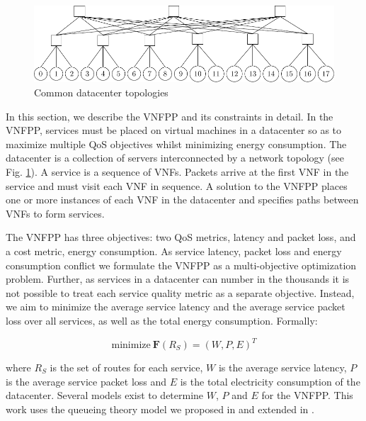 \begin{figure}[t]
\begin{minipage}{.53\textwidth}
        \includegraphics[width=\textwidth]{figures/topologies/leafspine}
    \end{minipage}\hfill
    \vspace{3em}
    \caption{Common datacenter topologies}
    \label{fig:topologies}
\end{figure}

In this section, we describe the VNFPP and its constraints in detail. In the VNFPP, services must be placed on virtual machines in a datacenter so as to maximize multiple QoS objectives whilst minimizing energy consumption. The datacenter is a collection of servers interconnected by a network topology (see Fig. \ref{fig:topologies}). A service is a sequence of VNFs. Packets arrive at the first VNF in the service and must visit each VNF in sequence. A solution to the VNFPP places one or more instances of each VNF in the datacenter and specifies paths between VNFs to form services. 

The VNFPP has three objectives: two QoS metrics, latency and packet loss, and a cost metric, energy consumption. As service latency, packet loss and energy consumption conflict \cite{BillingsleyLMMG20} we formulate the VNFPP as a multi-objective optimization problem. Further, as services in a datacenter can number in the thousands it is not possible to treat each service quality metric as a separate objective. Instead, we aim to minimize the average service latency and the average service packet loss over all services, as well as the total energy consumption. Formally:

\begin{equation}
	\text{minimize} \ \textbf{F}\left(R_S\right) = \left(W, P, E\right)^T
	\label{eq:mo_formulation}
\end{equation}

\noindent where $R_S$ is the set of routes for each service, $W$ is the average service latency, $P$ is the average service packet loss and $E$ is the total electricity consumption of the datacenter. Several models exist to determine $W$, $P$ and $E$ for the VNFPP. This work uses the queueing theory model we proposed in \cite{BillingsleyLMMG19} and extended in \cite{BillingsleyJOURNAL}.


